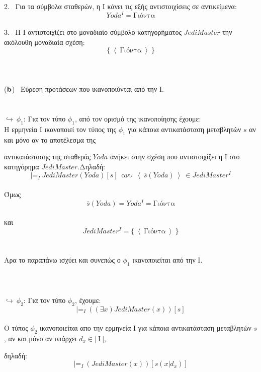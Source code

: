 \documentclass[10pt]{article}
\begin{document}
2. \ Για τα σύμβολα σταθερών, η Ι κάνει τις εξής αντιστοιχίσεις σε αντικείμενα:
\[
Yoda^{I} = \text{Γιόντα}
\] \\

3. \ Η Ι αντιστοιχίζει στο μοναδιαίο σύμβολο κατηγορήματος $JediMaster$ την ακόλουθη μοναδιαία σχέση:
\[
\{ \ \left< \ \text{Γιόντα} \ \right > \ \}
\]\\ \\ \\
($\bf b$) \normalfont \ Εύρεση προτάσεων που ικανοποιύνται από την Ι.  \\ \\ \\
$\hookrightarrow  \ \phi_1$: Για τον τύπο $\phi_1$, από τον ορισμό της ικανοποίησης έχουμε:
\\ 

Η ερμηνεία Ι ικανοποιεί τον τύπος της $\phi_1$ για κάποια αντικατάσταση μεταβλητών $s$ αν και μόνο αν το αποτέλεσμα της 

αντικατάστασης της σταθεράς $Yoda$ ανήκει στην σχέση που αντιστοιχίζει η Ι στο κατηγόρημα $JediMaster$.Δηλαδή: \\
\[
 |\text{=}_{I} \ JediMaster(Yoda)[s] \ \  \text{ανν} \ \ \left< \ \overline{s} (Yoda) \ \right > \
 \in JediMaster^{I}
\] \\ 

Όμως \\
\[
\overline{s} (Yoda) = Yoda^{I}= \text{Γιόντα} 
\] \\

και \\
\[
JediMaster^{I} = \{ \ \left< \ \text{Γιόντα} \ \right > \ \}
\] \\ \\

Αρα το παραπάνω ισχύει και συνεπώς ο $\phi_1$ ικανοποιείται από την Ι.  \\ \\ \\ \\
$\hookrightarrow  \ \phi_2$: Για τον τύπο $\phi_2$, έχουμε:
\\ 
\[
|\text{=}_{I} \ ((\exists x) JediMaster(x))[s]
\] \\

Ο τύπος $\phi_{2}$ ικανοποιείται απο την ερμηνεία Ι για κάποια αντικατάσταση μεταβλητών $s$, αν και μόνο αν υπάρχει $d_x \in \lvert \ \text{Ι} \ \rvert$,

δηλαδή:\\
\[
|\text{=}_{I} \ (JediMaster(x))[s(x|d_x)]
\] \\
\end{document}
